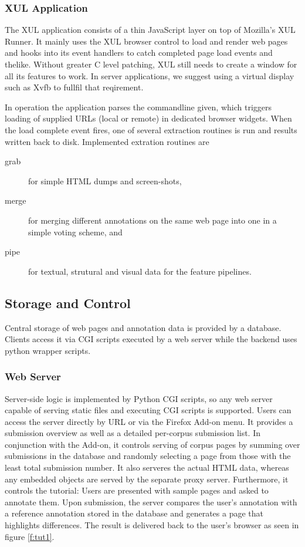 \subsubsection{XUL Application \label{app}}

The XUL application consists of a thin JavaScript layer on top of Mozilla's XUL Runner.
It mainly uses the XUL browser control to load and render web pages and hooks into its event handlers to catch completed page load events and thelike.
Without greater C level patching, XUL still needs to create a window for all its features to work.
In server applications, we suggest using a virtual display such as Xvfb to fullfil that reqirement.

In operation the application parses the commandline given, which triggers loading of supplied URLs (local or remote) in dedicated browser widgets.
When the load complete event fires, one of several extraction routines is run and results written back to disk.
Implemented extration routines are 
\begin{description}
\item[grab] for simple HTML dumps and screen-shots,
\item[merge] for merging different annotations on the same web page into one in a simple voting scheme, and
\item[pipe] for textual, strutural and visual data for the feature pipelines.
\end{description}


\subsection{Storage and Control}

Central storage of web pages and annotation data is provided by a database.
Clients access it via CGI scripts executed by a web server while the backend uses python wrapper scripts.

\subsubsection{Web Server}

Server-side logic is implemented by Python CGI scripts, so any web server capable of serving static files and executing CGI scripts is supported.
Users can access the server directly by URL or via the Firefox Add-on menu.
It provides a submission overview as well as a detailed per-corpus submission list.
In conjunction with the Add-on, it controls serving of corpus pages by summing over submissions in the database and randomly selecting a page from those with the least total submission number.
It also serveres the actual HTML data, whereas any embedded objects are served by the separate proxy server.
Furthermore, it controls the tutorial: Users are presented with sample pages and asked to annotate them.
Upon submission, the server compares the user's annotation with a reference annotation stored in the database and generates a page that highlights differences.
The result is delivered back to the user's browser as seen in figure \ref{f:tut1}.

